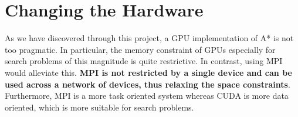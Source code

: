 \section{Changing the Hardware}
As we have discovered through this project, a GPU implementation of A* is not too pragmatic. In particular, the memory constraint of GPUs especially for search problems of this magnitude is quite restrictive. In contrast, using MPI would alleviate this. \textbf{MPI is not restricted by a single device and can be used across a network of devices, thus relaxing the space constraints}. Furthermore, MPI is a more task oriented system whereas CUDA is more data oriented, which is more suitable for search problems.